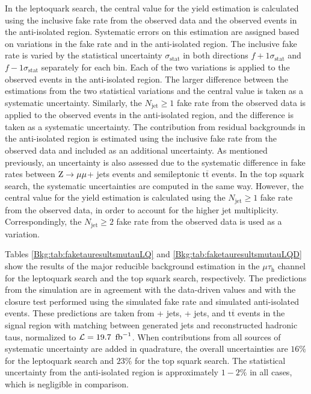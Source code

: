 \documentclass[12pt]{thesis}  %
\newcommand{\tauh}{\ensuremath{\tau_{\text{h}}}\xspace}
\newcommand{\mutau}{\ensuremath{\mu\tauh}\xspace}
\renewcommand{\ttbar}{\ensuremath{\mathrm{t}\overline{\mathrm{t}}}\xspace}
\newcommand{\ra}{\ensuremath{\rightarrow}}%
\newcommand{\Zmm}{\ensuremath{\Z \ra \mu\mu}\xspace}%
\newcommand{\thelumi}{\ensuremath{19.7~\fbinv}\xspace}
\begin{document}
In the leptoquark search, the central value for the yield estimation is calculated using the inclusive fake rate from the observed data and the observed events in the anti-isolated region. Systematic errors on this estimation are assigned based on variations in the fake rate and in the anti-isolated region. The inclusive fake rate is varied by the statistical uncertainty $\sigma_{\text{stat}}$ in both directions $f+1\sigma_{\text{stat}}$ and $f-1\sigma_{\text{stat}}$ separately for each bin. Each of the two variations is applied to the observed events in the anti-isolated region. The larger difference between the estimations from the two statistical variations and the central value is taken as a systematic uncertainty. Similarly, the $N_{\text{jet}} \geq 1$ fake rate from the observed data is applied to the observed events in the anti-isolated region, and the difference is taken as a systematic uncertainty. The contribution from residual backgrounds in the anti-isolated region is estimated using the inclusive fake rate from the observed data and included as an additional uncertainty. As mentioned previously, an uncertainty is also assessed due to the systematic difference in fake rates between \Zmm + jets events and semileptonic \ttbar events. In the top squark search, the systematic uncertainties are computed in the same way. However, the central value for the yield estimation is calculated using the $N_{\text{jet}} \geq 1$ fake rate from the observed data, in order to account for the higher jet multiplicity. Correspondingly, the $N_{\text{jet}} \geq 2$ fake rate from the observed data is used as a variation.

Tables \ref{Bkg:tab:faketauresultsmutauLQ} and \ref{Bkg:tab:faketauresultsmutauLQD} show the results of the major reducible background estimation in the \mutau channel for the leptoquark search and the top squark search, respectively. The predictions from the simulation are in agreement with the data-driven values and with the closure test performed using the simulated fake rate and simulated anti-isolated events. These predictions are taken from \W + jets, \Z + jets, and \ttbar events in the signal region with matching between generated jets and reconstructed hadronic taus, normalized to $\lumi = \thelumi$. When contributions from all sources of systematic uncertainty are added in quadrature, the overall uncertainties are $16\%$ for the leptoquark search and $23\%$ for the top squark search. The statistical uncertainty from the anti-isolated region is approximately $1-2\%$ in all cases, which is negligible in comparison.
\end{document}
